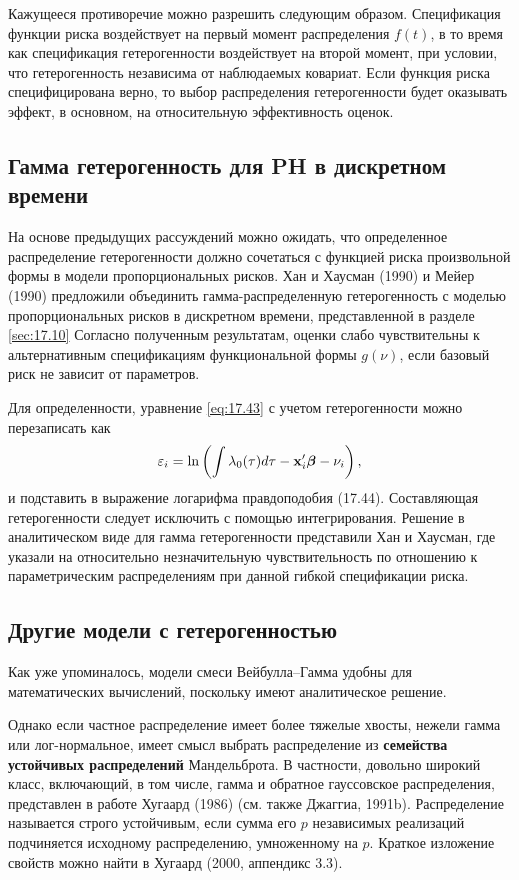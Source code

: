 Кажущееся противоречие можно разрешить следующим образом. Спецификация функции риска воздействует на первый момент распределения $f(t)$, в то время как спецификация гетерогенности воздействует на второй момент, при условии, что гетерогенность независима от наблюдаемых ковариат. Если функция риска специфицирована верно, то выбор распределения гетерогенности будет оказывать эффект, в основном, на относительную эффективность оценок.




\subsection{Гамма гетерогенность для PH в дискретном времени}\label{sec:18.4.1} %

\noindent
На основе предыдущих рассуждений можно ожидать, что определенное распределение гетерогенности должно сочетаться с функцией риска произвольной формы в модели пропорциональных рисков. Хан и Хаусман (1990) и Мейер (1990) предложили объединить гамма-распределенную гетерогенность с моделью пропорциональных рисков в дискретном времени, представленной в разделе \ref{sec:17.10} %
Согласно полученным результатам, оценки слабо чувствительны к альтернативным спецификациям функциональной формы $g(\nu)$, если базовый риск не зависит от параметров.

Для определенности, уравнение \ref{eq:17.43} %
с учетом гетерогенности можно перезаписать как
    $$\varepsilon_i = \ln \left( \int \lambda_0 (\tau) d\tau - \mathbf{x}_i'\bm{\beta} -\nu_i \right),$$
и подставить в выражение логарифма правдоподобия (17.44). %
Составляющая гетерогенности следует исключить с помощью интегрирования. Решение в аналитическом виде для гамма гетерогенности представили Хан и Хаусман, где указали на относительно незначительную чувствительность по отношению к параметрическим распределениям при данной гибкой спецификации риска.


\subsection{Другие модели с гетерогенностью}\label{sec:18.4.2}

\noindent
Как уже упоминалось, модели смеси Вейбулла--Гамма удобны для математических вычислений, поскольку имеют аналитическое решение.

Однако если частное распределение имеет более тяжелые хвосты, нежели гамма или лог-нормальное, имеет смысл выбрать распределение из \textbf{семейства устойчивых распределений} Мандельброта. В частности, довольно широкий класс, включающий, в том числе, гамма и обратное гауссовское распределения, представлен в работе Хугаард (1986) (см. также Джаггиа, 1991b). Распределение называется строго устойчивым, если сумма его $p$ независимых реализаций подчиняется исходному распределению, умноженному на $p$.
Краткое изложение свойств можно найти в Хугаард (2000, аппендикс 3.3).

